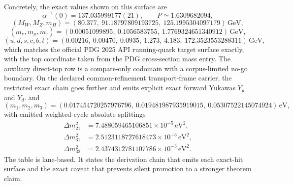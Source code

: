 \documentclass[11pt]{article}
\begin{document}
Concretely, the exact values shown on this surface are
\[
\alpha^{-1}(0)=137.035999177(21),
\qquad
P\simeq1.6309682094,
\]
\[
(M_W,M_Z,m_H)=
(80.377,\ 91.18797809193725,\ 125.1995304097179)\,\mathrm{GeV},
\]
\[
(m_e,m_\mu,m_\tau)=
(0.00051099895,\ 0.1056583755,\ 1.7769324651340912)\,\mathrm{GeV},
\]
\[
(u,d,s,c,b,t)=
(0.00216,\ 0.00470,\ 0.0935,\ 1.273,\ 4.183,\ 172.3523553288311)\,\mathrm{GeV},
\]
which matches the official PDG 2025 API running-quark target surface exactly, with the top coordinate taken from the PDG cross-section mass entry. The auxiliary direct-top row is a compare-only codomain with a corpus-limited no-go boundary. On the declared common-refinement transport-frame carrier, the restricted exact chain goes further and emits explicit exact forward Yukawas \(Y_u\) and \(Y_d\).
and
\[
(m_1,m_2,m_3)=
(0.017454720257976796,\ 0.019481987935919015,\ 0.05307522145074924)\,\mathrm{eV},
\]
with emitted weighted-cycle absolute splittings
\[
\begin{aligned}
\Delta m_{21}^2&=7.488059465106851\times10^{-5}\,\mathrm{eV}^2,\\
\Delta m_{31}^2&=2.5123118727618473\times10^{-3}\,\mathrm{eV}^2,\\
\Delta m_{32}^2&=2.4374312781107786\times10^{-3}\,\mathrm{eV}^2.
\end{aligned}
\]
The table is lane-based. It states the derivation chain that emits each exact-hit surface and the exact caveat that prevents silent promotion to a stronger theorem claim.
\end{document}
